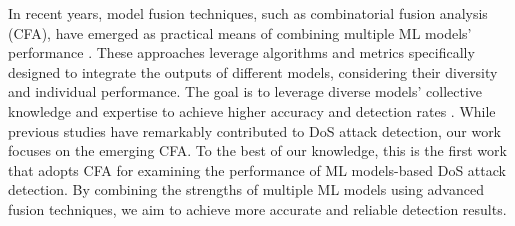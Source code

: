 

In recent years, model fusion techniques, such as combinatorial fusion analysis (CFA), have emerged as practical means of combining multiple ML models' performance \cite{hsu2006combinatorial, hsu2010rank}. These approaches leverage algorithms and metrics specifically designed to integrate the outputs of different models, considering their diversity and individual performance. The goal is to leverage diverse models' collective knowledge and expertise to achieve higher accuracy and detection rates \cite{hurley2020multi}. While previous studies have remarkably contributed to DoS attack detection, our work focuses on the emerging CFA. To the best of our knowledge, this is the first work that adopts CFA for examining the performance of ML models-based DoS attack detection. By combining the strengths of multiple ML models using advanced fusion techniques, we aim to achieve more accurate and reliable detection results.